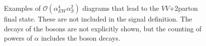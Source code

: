 %
\begin{figure}[tbp]
\begin{center}
\caption{
Examples of $\mathcal{O}(\alpha_{EW}^4 \alpha_{S}^2)$ diagrams that lead to the $VV$+2parton final state. These
are not included in the signal definition.  The decays of the bosons are not
explicitly shown, but the counting of powers of $\alpha$ includes the boson decays.
}
\label{fig:feynmanQCD}
\end{center}
\end{figure}



